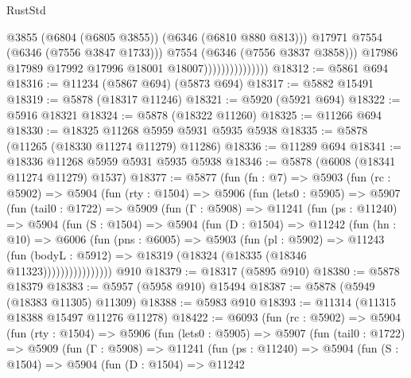 \begin{lexlean}{RustStd}
\begin{coremodule}
                                        @3855
                                        (@6804 (@6805 @3855))
                                        (@6346 (@6810 @880 @813)))
                                      @17971
                                      @7554
                                      (@6346 (@7556 @3847 @1733)))
                                    @7554
                                    (@6346 (@7556 @3837 @3858)))
                                  @17986
                                  @17989
                                  @17992
                                  @17996
                                  @18001
                                  @18007)))))))))))))))
@18312 := @5861 @694
@18316 := @11234 (@5867 @694) (@5873 @694)
@18317 := @5882 @15491
@18319 := @5878 (@18317 @11246)
@18321 := @5920 (@5921 @694)
@18322 := @5916 @18321
@18324 := @5878 (@18322 @11260)
@18325 := @11266 @694
@18330 := @18325 @11268 @5959 @5931 @5935 @5938
@18335 := @5878 (@11265 (@18330 @11274 @11279) @11286)
@18336 := @11289 @694
@18341 := @18336 @11268 @5959 @5931 @5935 @5938
@18346 := @5878 (@6008 (@18341 @11274 @11279) @1537)
@18377 := @5877
    (fun (fn : @7) =>
    @5903
      (fun (rc : @5902) =>
      @5904
        (fun (rty : @1504) =>
        @5906
          (fun (lets0 : @5905) =>
          @5907
            (fun (tail0 : @1722) =>
            @5909
              (fun (Γ : @5908) =>
              @11241
                (fun (ps : @11240) =>
                @5904
                  (fun (S : @1504) =>
                  @5904
                    (fun (D : @1504) =>
                    @11242
                      (fun (hn : @10) =>
                      @6006
                        (fun (pns : @6005) =>
                        @5903
                          (fun (pl : @5902) =>
                          @11243
                            (fun (bodyL : @5912) =>
                            @18319 (@18324 (@18335 (@18346 @11323))))))))))))))))
    @910
@18379 := @18317 (@5895 @910)
@18380 := @5878 @18379
@18383 := @5957 (@5958 @910) @15494
@18387 := @5878 (@5949 (@18383 @11305) @11309)
@18388 := @5983 @910
@18393 := @11314 (@11315 @18388 @15497 @11276 @11278)
@18422 := @6093
    (fun (rc : @5902) =>
    @5904
      (fun (rty : @1504) =>
      @5906
        (fun (lets0 : @5905) =>
        @5907
          (fun (tail0 : @1722) =>
          @5909
            (fun (Γ : @5908) =>
            @11241
              (fun (ps : @11240) =>
              @5904
                (fun (S : @1504) =>
                @5904
                  (fun (D : @1504) =>
                  @11242

\end{coremodule}
\end{lexlean}
